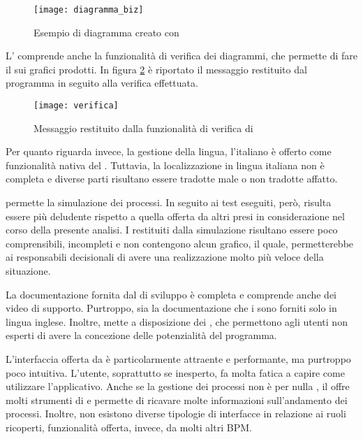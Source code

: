 \begin{figure}[H]
  \centering
  \texttt{[image: diagramma\_biz]}
  \caption{Esempio di diagramma creato con  }
  \label{fig:diagramma_biz}
\end{figure}

L' comprende anche la funzionalità di verifica dei diagrammi, che permette di fare il   sui grafici prodotti.
In figura \ref{fig:verifica} è riportato il messaggio restituito dal programma in seguito alla verifica effettuata.

\begin{figure}[H]
  \centering
  \texttt{[image: verifica]}
  \caption{Messaggio restituito dalla funzionalità di verifica di }
  \label{fig:verifica}
\end{figure}
Per quanto riguarda invece, la gestione della lingua, l'italiano è offerto come funzionalità nativa del \sw \progname. Tuttavia, la localizzazione in lingua italiana non è completa e diverse parti risultano essere tradotte male o non tradotte affatto.

\progname permette la simulazione dei processi. In seguito ai test eseguiti, però, risulta essere più deludente rispetto a quella offerta da altri \sw presi in considerazione nel corso della presente analisi.
I  restituiti dalla simulazione risultano essere poco comprensibili, incompleti e non contengono alcun grafico, il quale, permetterebbe ai responsabili decisionali di avere una realizzazione molto più veloce della situazione.
 
La documentazione fornita dal  di sviluppo è completa e comprende anche dei video  di supporto. Purtroppo, sia la documentazione che i  sono forniti solo in lingua inglese. Inoltre, \progname mette a disposizione dei , che permettono agli utenti non esperti di avere la concezione delle potenzialità del programma.

L'interfaccia offerta da  è particolarmente attraente e performante, ma purtroppo poco intuitiva. L'utente, soprattutto se inesperto, fa molta fatica a capire come utilizzare l'applicativo. Anche se la gestione dei processi non è per nulla , il \sw offre molti strumenti di  e permette di ricavare molte informazioni sull'andamento dei processi.
Inoltre, non esistono diverse tipologie di interfacce in relazione ai ruoli ricoperti, funzionalità offerta, invece, da molti altri \sw BPM.

